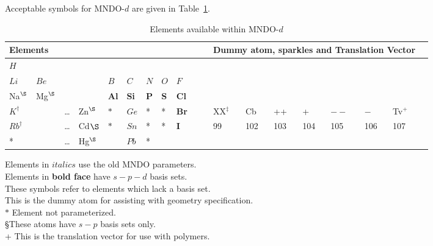 Acceptable symbols for MNDO-$d$ are given in Table~\ref{mndodel}.

\begin{table}
\begin{center}
\caption{\label{mndodel} Elements available within MNDO-$d$}
\hspace*{-0.7in}
\compresstable
\begin{tabular}{lllllllllllllllllll}
\multicolumn{7}{l}{Elements}&&&&&\multicolumn{7}{l}{Dummy atom, sparkles and
 Translation Vector} \\
\hline
   $H$  \\
  $Li$ & $Be$&&& $B$& $C$& $N$& $O$& $F$           \\
  Na$^{\S}$&Mg$^{\S}$&&&{\bf Al}&{\bf Si}& {\bf P}& {\bf S}&{\bf Cl} &&&       &                         \\
   $K^{\dag}$& & \ldots&Zn$^{\S}$&$ *$&$Ge$& *& *&{\bf Br }&&&     XX$^{\ddag}$& Cb& ++&  +& $--$&  $-$& Tv$^+$  \\
  $Rb^{\dag}$&&\ldots&Cd${\S}$&$*$&$Sn$& *& *& {\bf I} &&
&     99&102&103&104&105&106&107  \\
  *  &&\ldots&Hg$^{\S}$&&$Pb$& *&   \\
\hline
\end{tabular}
\end{center}
Elements in $italics$ use the old MNDO parameters.\\
Elements in {\bf bold face} have $s-p-d$ basis sets.\\
\dag  These symbols refer to elements which lack a basis set.  \\
\ddag  This is the dummy atom for assisting with geometry specification.  \\
$*$  Element not parameterized.  \\
\S These atoms have $s-p$ basis sets only.\\
+  This is the translation vector for use with polymers.  \\
\end{table}


